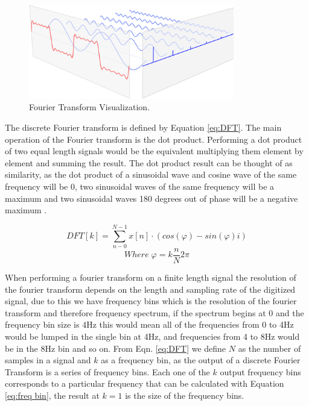 \documentclass{UoNMCHA}
\numberwithin{equation}{section}
\begin{document}
    \begin{figure}[H]
        \centering
        \includegraphics[keepaspectratio, width = 0.8\textwidth]{Figures/FFT.png}
        \caption{Fourier Transform Visualization.}
        \label{fig:Fourier Transform}
    \end{figure}
    
    The discrete Fourier transform is defined by Equation \ref{eq:DFT}. The main operation of the Fourier transform is the dot product. Performing a dot product of two equal length signals would be the equivalent multiplying them element by element and summing the result. The dot product result can be thought of as similarity, as the dot product of a sinusoidal wave and cosine wave of the same frequency will be 0, two sinusoidal waves of the same frequency will be a maximum and two sinusoidal waves 180 degrees out of phase will be a negative maximum \citep{Sch17}. 
    
    \begin{equation}
        DFT[k]=\sum_{n-0}^{N-1}x[n] \cdot (cos(\varphi) - sin(\varphi)i)
        \label{eq:DFT}
    \end{equation}
        \begin{equation*}
        Where \; \varphi = k \frac{n}{N}2 \pi
    \end{equation*}
    
    When performing a fourier transform on a finite length signal the resolution of the fourier transform depends on the length and sampling rate of the digitized signal, due to this we have frequency bins which is the resolution of the fourier transform and therefore frequency spectrum, if the spectrum begins at 0 and the frequency bin size is 4Hz this would mean all of the frequencies from 0 to 4Hz would be lumped in the single bin at 4Hz, and frequencies from 4 to 8Hz would be in the 8Hz bin and so on. From Eqn. \ref{eq:DFT} we define $N$ as the number of samples in a signal and $k$ as a frequency bin, as the output of a discrete Fourier Transform is a series of frequency bins. Each one of the $k$ output frequency bins corresponds to a particular frequency that can be calculated with Equation \ref{eq:freq bin}, the result at $k=1$ is the size of the frequency bins.
    
\end{document}
